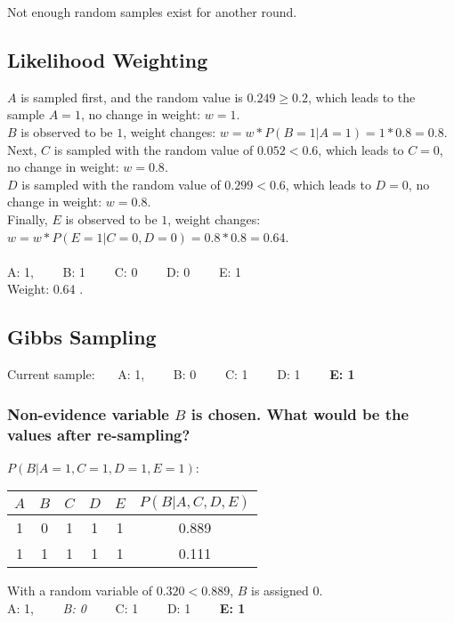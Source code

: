\documentclass{homework}
\begin{document}
Not enough random samples exist for another round.

\subsection{Likelihood Weighting}
$A$ is sampled first, and the random value is $0.249 \geq 0.2$, which leads to the sample $A = 1$, no change in weight: $w = 1$.\\
$B$ is observed to be $1$, weight changes: $w = w * P(B = 1 | A = 1) = 1 * 0.8 = 0.8$.\\
Next, $C$ is sampled with the random value of $0.052 < 0.6$, which leads to $C = 0$, no change in weight: $w = 0.8$.\\
$D$ is sampled with the random value of $0.299 < 0.6$, which leads to $D = 0$, no change in weight: $w = 0.8$.\\
Finally, $E$ is observed to be $1$, weight changes: $w = w * P(E = 1 | C = 0, D = 0) = 0.8 * 0.8 = 0.64$.\\\\
A: 1, \ \ \ \ B: 1 \ \ \ \ C: 0 \ \ \ \ D: 0 \ \ \ \ E: 1 \\
Weight: 0.64 . \\

\clearpage
\subsection{Gibbs Sampling}
{\large Current sample: \ \ \  A: 1, \ \ \ \ B: 0 \ \ \ \ C: 1 \ \ \ \ D: 1 \ \ \ \ \textbf{E: 1} } \\
\subsubsection{Non-evidence variable $B$ is chosen. What would be the values after re-sampling?}
$P(B | A=1, C=1, D=1, E=1)$:

\begin{table}[h!]
    \centering
    \begin{tabular}{ccccc|c}
        $A$ & $B$ & $C$ & $D$ & $E$ & $P(B | A, C, D, E)$ \\
        \midrule
        1 & 0 & 1 & 1 & 1 & 0.889 \\
        1 & 1 & 1 & 1 & 1 & 0.111 \\
    \end{tabular}
\end{table}
With a random variable of $0.320 < 0.889$, $B$ is assigned $0$.\\
A: 1, \ \ \ \ \textit{B: 0} \ \ \ \ C: 1 \ \ \ \ D: 1 \ \ \ \ \textbf{E: 1} \\
\end{document}
